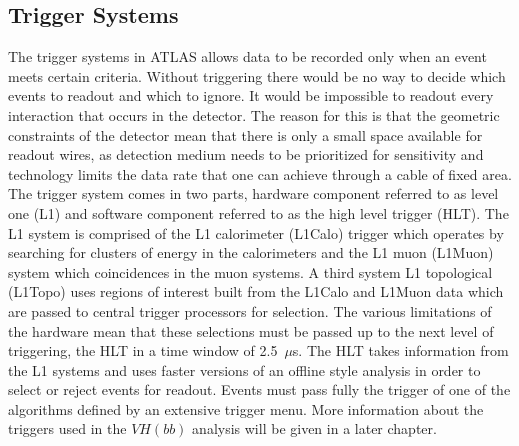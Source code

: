 \subsection{Trigger Systems}%
\label{sec:trigger}

The trigger systems in ATLAS allows data to be recorded only when an event meets
certain criteria. Without triggering there would be no way to decide which
events to readout and which to ignore. It would be impossible to readout every
interaction that occurs in the detector. The reason for this is that the
geometric constraints of the detector mean that there is only a small space
available for readout wires, as detection medium needs to be prioritized for
sensitivity and technology limits the data rate that one can achieve through a
cable of fixed area. The trigger system comes in two parts, hardware component
referred to as level one (L1) and software component referred to as the high
level trigger (HLT). The L1 system is comprised of the L1 calorimeter (L1Calo)
trigger which operates by searching for clusters of energy in the calorimeters
and the L1 muon (L1Muon) system which coincidences in the muon systems. A third
system L1 topological (L1Topo) uses regions of interest built from the L1Calo
and L1Muon data which are passed to central trigger processors for selection.
The various limitations of the hardware mean that these selections must be
passed up to the next level of triggering, the HLT in a time window of
2.5~$\mu$s. The HLT takes information from the L1 systems and uses faster
versions of an offline style analysis in order to select or reject events for
readout. Events must pass fully the trigger of one of the algorithms defined by
an extensive trigger menu. More information about the triggers used in the
$VH(bb)$ analysis will be given in a later chapter.
